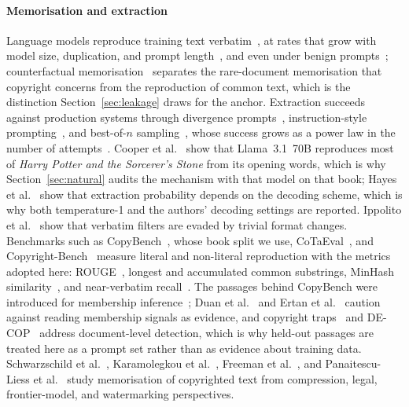 \paragraph{Memorisation and extraction}
Language models reproduce training text verbatim~\cite{carlini2021extracting}, at rates that grow with model size, duplication, and prompt length~\cite{carlini2023quantifying,huang2024demystifying}, and even under benign prompts~\cite{aerni2025nonadversarial}; counterfactual memorisation~\cite{zhang2023counterfactual} separates the rare-document memorisation that copyright concerns from the reproduction of common text, which is the distinction Section~\ref{sec:leakage} draws for the anchor. Extraction succeeds against production systems through divergence prompts~\cite{nasr2025scalable}, instruction-style prompting~\cite{kassem2025alpaca}, and best-of-$n$ sampling~\cite{ahmed2026extracting}, whose success grows as a power law in the number of attempts~\cite{hughes2024bestofn}. Cooper et al.~\cite{cooper2025extracting} show that Llama~3.1~70B reproduces most of \emph{Harry Potter and the Sorcerer's Stone} from its opening words, which is why Section~\ref{sec:natural} audits the mechanism with that model on that book; Hayes et al.~\cite{hayes2025measuring} show that extraction probability depends on the decoding scheme, which is why both temperature-1 and the authors' decoding settings are reported. Ippolito et al.~\cite{ippolito2023preventing} show that verbatim filters are evaded by trivial format changes. Benchmarks such as CopyBench~\cite{chen2024copybench}, whose book split we use, CoTaEval~\cite{wei2024cotaeval}, and Copyright-Bench~\cite{hui2026copyrightbench} measure literal and non-literal reproduction with the metrics adopted here: ROUGE~\cite{lin2004rouge}, longest and accumulated common substrings, MinHash similarity~\cite{broder1997resemblance}, and near-verbatim recall~\cite{ahmed2026extracting}. The passages behind CopyBench were introduced for membership inference~\cite{shi2024detecting}; Duan et al.~\cite{duan2024membership} and Ertan et al.~\cite{ertan2026evidentiary} caution against reading membership signals as evidence, and copyright traps~\cite{meeus2024traps} and DE-COP~\cite{duarte2024decop} address document-level detection, which is why held-out passages are treated here as a prompt set rather than as evidence about training data. Schwarzschild et al.~\cite{schwarzschild2024rethinking}, Karamolegkou et al.~\cite{karamolegkou2023copyright}, Freeman et al.~\cite{freeman2024exploring}, and Panaitescu-Liess et al.~\cite{panaitescu2025watermarking} study memorisation of copyrighted text from compression, legal, frontier-model, and watermarking perspectives.

